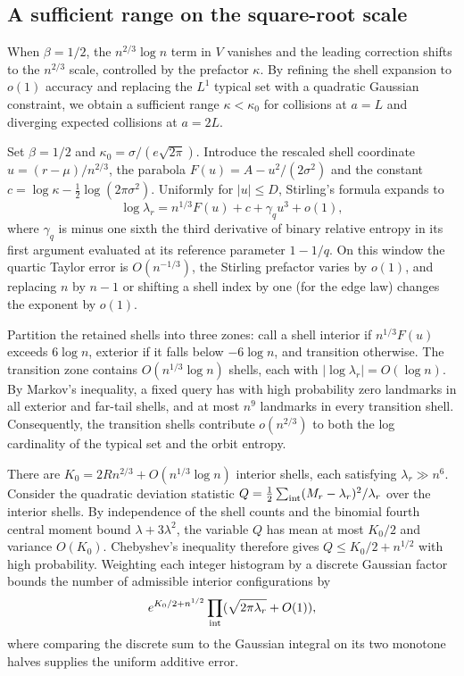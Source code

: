 \subsection{A sufficient range on the square-root scale}
When $\beta=1/2$, the $n^{2/3}\log n$ term in $V$ vanishes and the leading correction shifts to the $n^{2/3}$ scale, controlled by the prefactor $\kappa$. By refining the shell expansion to $o(1)$ accuracy and replacing the $L^1$ typical set with a quadratic Gaussian constraint, we obtain a sufficient range $\kappa<\kappa_0$ for collisions at $a=L$ and diverging expected collisions at $a=2L$.

Set $\beta=1/2$ and $\kappa_0=\sigma/(e\sqrt{2\pi})$. Introduce the rescaled shell coordinate $u=(r-\mu)/n^{2/3}$, the parabola $F(u)=A-u^2/(2\sigma^2)$ and the constant $c=\log\kappa-\tfrac12\log(2\pi\sigma^2)$. Uniformly for $|u|\le D$, Stirling's formula expands to
\[
 \log\lambda_r=n^{1/3}F(u)+c+\gamma_q u^3+o(1),
\]
where $\gamma_q$ is minus one sixth the third derivative of binary relative entropy in its first argument evaluated at its reference parameter $1-1/q$. On this window the quartic Taylor error is $O(n^{-1/3})$, the Stirling prefactor varies by $o(1)$, and replacing $n$ by $n-1$ or shifting a shell index by one (for the edge law) changes the exponent by $o(1)$.

Partition the retained shells into three zones: call a shell interior if $n^{1/3}F(u)$ exceeds $6\log n$, exterior if it falls below $-6\log n$, and transition otherwise. The transition zone contains $O(n^{1/3}\log n)$ shells, each with $|\log\lambda_r|=O(\log n)$. By Markov's inequality, a fixed query has with high probability zero landmarks in all exterior and far-tail shells, and at most $n^9$ landmarks in every transition shell. Consequently, the transition shells contribute $o(n^{2/3})$ to both the log cardinality of the typical set and the orbit entropy.

There are $K_0=2Rn^{2/3}+O(n^{1/3}\log n)$ interior shells, each satisfying $\lambda_r\gg n^6$. Consider the quadratic deviation statistic $Q=\frac12\sum_{\rm int}(M_r-\lambda_r)^2/\lambda_r$ over the interior shells. By independence of the shell counts and the binomial fourth central moment bound $\lambda+3\lambda^2$, the variable $Q$ has mean at most $K_0/2$ and variance $O(K_0)$. Chebyshev's inequality therefore gives $Q\le K_0/2+n^{1/2}$ with high probability. Weighting each integer histogram by a discrete Gaussian factor bounds the number of admissible interior configurations by
\[
 e^{K_0/2+n^{1/2}}\prod_{\rm int}(\sqrt{2\pi\lambda_r}+O(1)),
\]
where comparing the discrete sum to the Gaussian integral on its two monotone halves supplies the uniform additive error.

